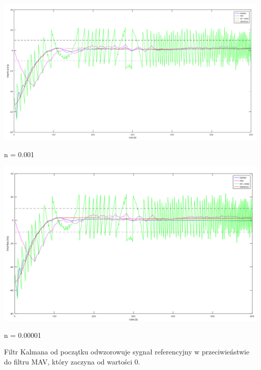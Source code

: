 \documentclass[11pt]{article}
\begin{document}
\begin{center}
	\includegraphics[width=15cm]{kalman1.png}
	
	n = 0.001
\end{center}

\begin{center}
	\includegraphics[width=15cm]{kalman2.png}
	
	n = 0.00001
\end{center}

Filtr Kalmana od początku odwzorowuje sygnał referencyjny w przeciwieństwie do filtru MAV, który zaczyna od wartości 0.
\end{document}
